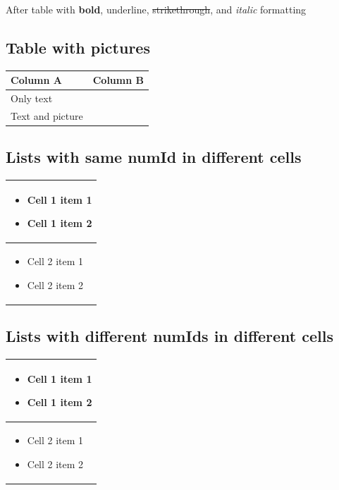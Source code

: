 \documentclass[11pt,a4paper]{article}
\begin{document}
After table with \textbf{bold}, underline, \sout{strikethrough}, and \textit{italic} formatting

\subsection{Table with pictures}

\begin{table}[h]
\begin{tabular}{|l|l|}
\hline
Column A & Column B \\ \hline
Only text & %
 \\ \hline
Text and picture  %
 &  \\ \hline
\end{tabular}
\end{table}

\subsection{Lists with same numId in different cells}

\begin{table}[h]
\begin{tabular}{|l|}
\hline
\begin{itemize} \item Cell 1 item 1 \item Cell 1 item 2 \end{itemize} \\ \hline
\begin{itemize} \item Cell 2 item 1 \item Cell 2 item 2 \end{itemize} \\ \hline
\end{tabular}
\end{table}

\subsection{Lists with different numIds in different cells}

\begin{table}[h]
\begin{tabular}{|l|}
\hline
\begin{itemize} \item Cell 1 item 1 \item Cell 1 item 2 \end{itemize} \\ \hline
\begin{itemize} \item Cell 2 item 1 \item Cell 2 item 2 \end{itemize} \\ \hline
\end{tabular}
\end{table}
\end{document}
